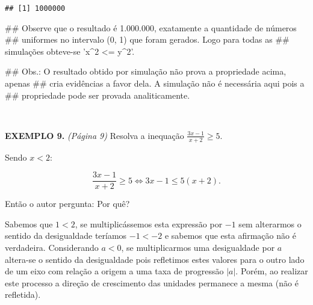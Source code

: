 \documentclass[]{book}
\newenvironment{Shaded}{\begin{snugshade}}{\end{snugshade}}
\newcommand{\NormalTok}[1]{#1}
\begin{document}
\begin{verbatim}
## [1] 1000000
\end{verbatim}

\begin{Shaded}
\begin{Highlighting}[]
\NormalTok{##  Observe que o resultado é 1.000.000, exatamente a quantidade de números}
\NormalTok{## uniformes no intervalo (0, 1) que foram gerados. Logo para todas as}
\NormalTok{## simulações obteve-se 'x^2 <= y^2'.}

\NormalTok{##  Obs.: O resultado obtido por simulação não prova a propriedade acima, apenas}
\NormalTok{## cria evidências a favor dela. A simulação não é necessária aqui pois a}
\NormalTok{## propriedade pode ser provada analiticamente.}
\end{Highlighting}
\end{Shaded}

~

\textbf{EXEMPLO 9.} \emph{(Página 9)} Resolva a inequação
\(\frac{3x-1}{x+2} \geqslant 5\).

Sendo \(x < 2\):

\[\frac{3x-1}{x+2} \geqslant 5 \Leftrightarrow 3x-1 \leqslant 5(x+2).\]

Então o autor pergunta: Por quê?

Sabemos que \(1 < 2\), se multiplicássemos esta expressão por \(-1\) sem
alterarmos o sentido da desigualdade teríamos \(-1 < -2\) e sabemos que
esta afirmação não é verdadeira. Considerando \(a < 0\), se
multiplicarmos uma desigualdade por \(a\) altera-se o sentido da
desigualdade pois refletimos estes valores para o outro lado de um eixo
com relação a origem a uma taxa de progressão \(\left | a \right |\).
Porém, ao realizar este processo a direção de crescimento das unidades
permanece a mesma (não é refletida).

~
\end{document}
